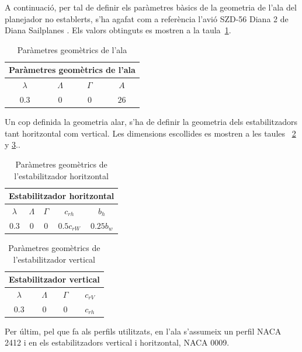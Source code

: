 A continuació, per tal de definir els paràmetres bàsics de la geometria de l'ala del planejador no establerts, s'ha agafat com a referència l'avió SZD-56 Diana 2 de Diana Sailplanes \cite{Kubrynski2006}. Els valors obtinguts es mostren a la taula~\ref{tab:WingGeom}.

\begin{table} [h]
	\centering
	\begin{tabular}{| c | c | c | c |}	
		\hline
		\multicolumn{4}{|c|}{\bfseries Paràmetres geomètrics de l'ala} \\
		\hline\hline
	\textbf{$\lambda$} & \textbf{$\Lambda$} & \textbf{$\Gamma$} & \textbf{$A$}\\ \hline 
		$0.3$ & $0$ & $0$ & $26$\\
		\hline	
	\end{tabular}
\caption{Paràmetres geomètrics de l'ala} \label{tab:WingGeom}
\end{table}

Un cop definida la geometria alar, s'ha de definir la geometria dels estabilitzadors tant horitzontal com vertical. Les dimensions escollides es mostren a les taules~ \ref{tab:HSGeom} y \ref{tab:VSGeom}..

\begin{table} [h]
	\centering
	\begin{tabular}{| c | c | c | c | c |}	
		\hline
		\multicolumn{5}{|c|}{\bfseries Estabilitzador horitzontal} \\
		\hline\hline
	\textbf{$\lambda$} & \textbf{$\Lambda$} & \textbf{$\Gamma$} & \textbf{$c_{rh}$} & \textbf{$b_{h}$} \\ \hline
		$0.3$ & $0$ & $0$ & $0.5c_{rW}$ & $0.25b_{w}$\\
		\hline	
	\end{tabular}
\caption{Paràmetres geomètrics de l'estabilitzador horitzontal} \label{tab:HSGeom}
\end{table}

\begin{table} [h]
	\centering
	\begin{tabular}{| c | c | c | c |}	
		\hline
		\multicolumn{4}{|c|}{\bfseries Estabilitzador vertical} \\
		\hline\hline
	\textbf{$\lambda$} & \textbf{$\Lambda$} & \textbf{$\Gamma$} & \textbf{$c_{rV}$}  \\ \hline
		$0.3$ & $0$ & $0$ & $c_{rh}$ \\
		\hline	
	\end{tabular}
\caption{Paràmetres geomètrics de l'estabilitzador vertical} \label{tab:VSGeom}
\end{table}

Per últim, pel que fa als perfils utilitzats, en l'ala s'assumeix un perfil NACA 2412 i en els estabilitzadors vertical i horitzontal, NACA 0009.
